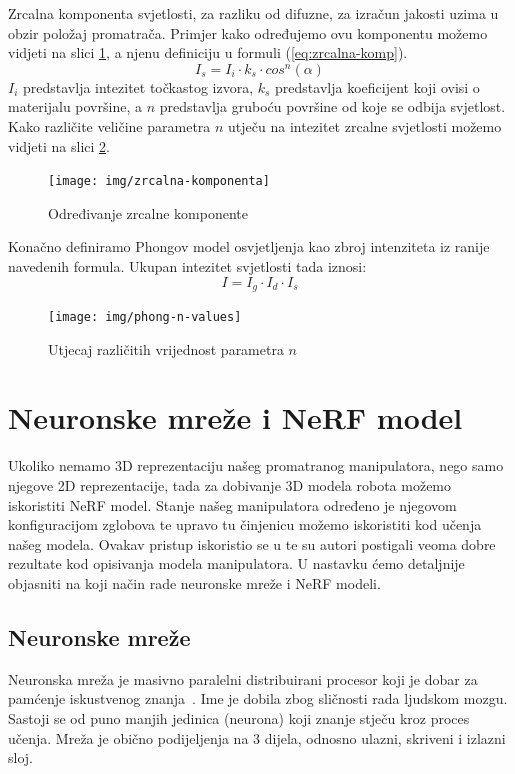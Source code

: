 \documentclass[times, utf8, diplomskirad]{fer}
\begin{document}
Zrcalna komponenta svjetlosti, za razliku od difuzne, za izračun jakosti uzima u obzir položaj promatrača.
Primjer kako određujemo ovu komponentu možemo vidjeti na slici \ref{fig:zrcalna-svjetlost}, a njenu definiciju u formuli (\ref{eq:zrcalna-komp}).
\begin{equation}
    I_s = I_i \cdot k_s \cdot cos^n(\alpha)
    \label{eq:zrcalna-komp}
\end{equation}
$I_i$ predstavlja intezitet točkastog izvora, $k_s$ predstavlja koeficijent koji ovisi o materijalu površine, a $n$ predstavlja gruboću površine od koje se odbija svjetlost.
Kako različite veličine parametra $n$ utječu na intezitet zrcalne svjetlosti možemo vidjeti na slici \ref{fig:phong-n-param}.
\begin{figure}[H]
    \centering
    \texttt{[image: img/zrcalna-komponenta]}
    \caption{Određivanje zrcalne komponente}
    \label{fig:zrcalna-svjetlost}
\end{figure}

\newpage
Konačno definiramo Phongov model osvjetljenja kao zbroj intenziteta iz ranije navedenih formula.
Ukupan intezitet svjetlosti tada iznosi:
\begin{equation}
    I = I_g \cdot I_d \cdot I_s
    \label{eq:phong-svjetlost}
\end{equation}

\begin{figure}[H]
    \centering
    \texttt{[image: img/phong-n-values]}
    \caption{Utjecaj različitih vrijednost parametra $n$}
    \label{fig:phong-n-param}
\end{figure}

\chapter{Neuronske mreže i NeRF model}
Ukoliko nemamo 3D reprezentaciju našeg promatranog manipulatora, nego samo njegove 2D reprezentacije, tada za dobivanje 3D modela robota možemo iskoristiti NeRF model.
Stanje našeg manipulatora određeno je njegovom konfiguracijom zglobova te upravo tu činjenicu možemo iskoristiti kod učenja našeg modela.
Ovakav pristup iskoristio se u \cite{nerfSelfModelling} te su autori postigali veoma dobre rezultate kod opisivanja modela manipulatora.
U nastavku ćemo detaljnije objasniti na koji način rade neuronske mreže i NeRF modeli.

\section{Neuronske mreže}
Neuronska mreža je masivno paralelni distribuirani procesor koji je dobar za pamćenje iskustvenog znanja~\cite{defNeuronske}.
Ime je dobila zbog sličnosti rada ljudskom mozgu.
Sastoji se od puno manjih jedinica (neurona) koji znanje stječu kroz proces učenja.
Mreža je obično podijeljenja na 3 dijela, odnosno ulazni, skriveni i izlazni sloj.
\end{document}
